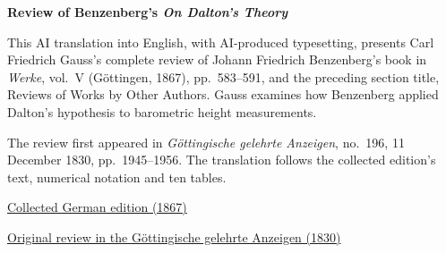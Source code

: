\clearpage
\thispagestyle{empty}
\begin{center}\Large\textbf{Review of Benzenberg’s \textit{On Dalton’s Theory}}\end{center}

This AI translation into English, with AI-produced typesetting, presents Carl Friedrich Gauss’s complete review of Johann Friedrich Benzenberg’s book in \textit{Werke}, vol.~V (Göttingen, 1867), pp.~583--591, and the preceding section title, Reviews of Works by Other Authors. Gauss examines how Benzenberg applied Dalton’s hypothesis to barometric height measurements.

The review first appeared in \textit{Göttingische gelehrte Anzeigen}, no.~196, 11 December 1830, pp.~1945--1956. The translation follows the collected edition’s text, numerical notation and ten tables.

\medskip\noindent
\href{https://gdz.sub.uni-goettingen.de/id/PPN236006339}{Collected German edition (1867)}\par
\noindent\href{https://gdz.sub.uni-goettingen.de/id/PPN385030444_1830_3}{Original review in the Göttingische gelehrte Anzeigen (1830)}
\clearpage
